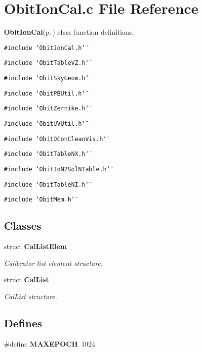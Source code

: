 \section{Obit\-Ion\-Cal.c File Reference}
\label{ObitIonCal_8c}
{\bf Obit\-Ion\-Cal}{\rm (p.\,\pageref{structObitIonCal})} class function definitions. 

{\tt \#include \char`\"{}Obit\-Ion\-Cal.h\char`\"{}}\par
{\tt \#include \char`\"{}Obit\-Table\-VZ.h\char`\"{}}\par
{\tt \#include \char`\"{}Obit\-Sky\-Geom.h\char`\"{}}\par
{\tt \#include \char`\"{}Obit\-PBUtil.h\char`\"{}}\par
{\tt \#include \char`\"{}Obit\-Zernike.h\char`\"{}}\par
{\tt \#include \char`\"{}Obit\-UVUtil.h\char`\"{}}\par
{\tt \#include \char`\"{}Obit\-DCon\-Clean\-Vis.h\char`\"{}}\par
{\tt \#include \char`\"{}Obit\-Table\-NX.h\char`\"{}}\par
{\tt \#include \char`\"{}Obit\-Io\-N2Sol\-NTable.h\char`\"{}}\par
{\tt \#include \char`\"{}Obit\-Table\-NI.h\char`\"{}}\par
{\tt \#include \char`\"{}Obit\-Mem.h\char`\"{}}\par
\subsection*{Classes}
\begin{CompactItemize}
\item 
struct {\bf Cal\-List\-Elem}
\begin{CompactList}\small\item\em Calibrator list element structure. \item\end{CompactList}\item 
struct {\bf Cal\-List}
\begin{CompactList}\small\item\em Cal\-List structure. \item\end{CompactList}\end{CompactItemize}
\subsection*{Defines}
\begin{CompactItemize}
\item 
\#define {\bf MAXEPOCH}\ 1024
\end{CompactItemize}
